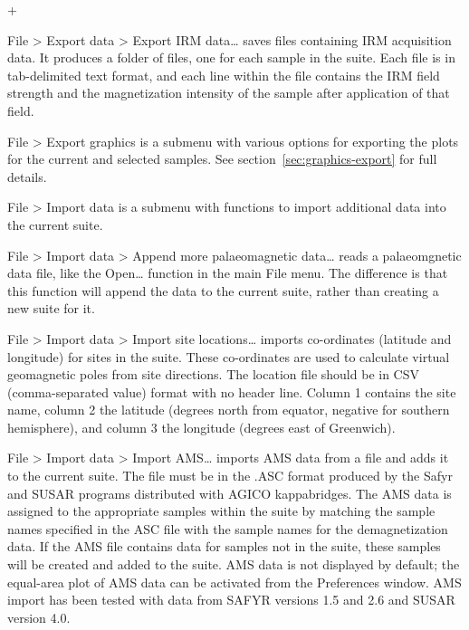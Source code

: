 \documentclass[a4paper,british]{article}
\newcommand{\menuitemlabel}[1]{%
\mbox{\textsf{#1}}\hfil}
\newenvironment{menuitemlist}%
{\begin{list}{}{%
\renewcommand{\makelabel}{\menuitemlabel}%
\setlength{\labelwidth}{35pt}%
\setlength{\leftmargin}%
             {\labelwidth+\labelsep}}}%
{\end{list}}
\newcommand{\ppcmd}[1]{\textsf{#1}} %
\newcommand{\caps}[1]{\MakeTextUppercase{#1}} %
\newcommand{\submenu}{ \textgreater{} } %
\begin{document}
\begin{menuitemlist}
\item[File\submenu Export data\submenu Export IRM data\ldots] saves files
  containing \caps{irm} acquisition data. It produces a folder of files, one
  for each sample in the suite. Each file is in tab-delimited text format,
  and each line within the file contains the \caps{irm} field strength and
  the magnetization intensity of the sample after application of that field.

\item[File\submenu Export graphics] is a submenu with various options
  for exporting the plots for the current and selected samples.
  See section~\ref{sec:graphics-export} for full details.

\item[File\submenu Import data] is a submenu with functions to import
  additional data into the current suite.

\item[File\submenu Import data\submenu Append more palaeomagnetic data\ldots]
  reads a palaeomgnetic data file, like the \ppcmd{Open\ldots} function
  in the main \ppcmd{File} menu. The difference is that this function
  will append the data to the current suite, rather than creating a 
  new suite for it.

\item[File\submenu Import data\submenu Import site locations\ldots]
  imports co-ordinates (latitude and longitude) for sites in the suite.
  These co-ordinates are used to calculate virtual geomagnetic poles
  from site directions. The location file should be in \caps{csv}
  (comma-separated value) format with no header line. Column 1 contains
  the site name, column 2 the latitude (degrees north from equator,
  negative for southern hemisphere), and column 3 the longitude (degrees
  east of Greenwich).

\item[File\submenu Import data\submenu Import AMS\ldots] imports
  \caps{ams} data from a file and adds it to the current suite. The file
  must be in the \caps{.asc} format produced by the \ppcmd{Safyr} and
  \caps{Susar} programs distributed with \caps{Agico} kappabridges. The
  \caps{ams} data is assigned to the appropriate samples within the
  suite by matching the sample names specified in the \caps{asc} file
  with the sample names for the demagnetization data. If the \caps{ams}
  file contains data for samples not in the suite, these samples will be
  created and added to the suite. \caps{Ams} data is not displayed by
  default; the equal-area plot of \caps{ams} data can be activated from
  the \ppcmd{Preferences} window. AMS import has been tested with data
  from \caps{Safyr} versions 1.5 and 2.6 and \caps{Susar} version 4.0.


\end{menuitemlist}
\end{document}
